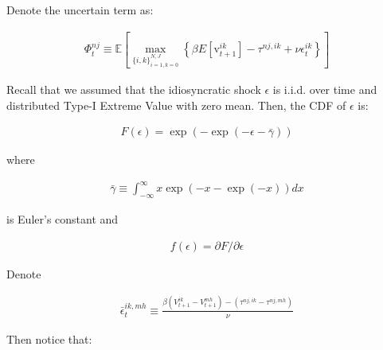 \documentclass[10pt]{article}
\begin{document}
Denote the uncertain term as:

\begin{align}
    \Phi_t^{n j} \equiv \mathbb{E}\left[\max _{\{i, k\}_{i=1, k=0}^{N, J}}\left\{\beta E\left[\mathrm{v}_{t+1}^{i k}\right]-\tau^{n j, i k}+\nu \epsilon_t^{i k}\right\}\right]
\end{align}

Recall that we assumed that the idiosyncratic shock $\epsilon$ is i.i.d. over time
and distributed Type-I Extreme Value with zero mean. Then, the 
CDF of $\epsilon$ is:

\begin{align}
    F(\epsilon)=\exp (-\exp (-\epsilon-\bar{\gamma}))
\end{align}

where 

\begin{align}
    \bar{\gamma} \equiv \int_{-\infty}^{\infty} x \exp (-x-\exp (-x)) d x
\end{align}

is Euler's constant and 

\begin{align}
    f(\epsilon)=\partial F / \partial \epsilon
\end{align}

Denote

\begin{align}
    \bar{\epsilon}_t^{i k, m h} \equiv \frac{\beta\left(V_{t+1}^{i k}-V_{t+1}^{m h}\right)-\left(\tau^{n j, i k}-\tau^{n j, m h}\right)}{\nu} \label{eq:bar_epsilon_exp}
\end{align}

Then notice that:
\end{document}

